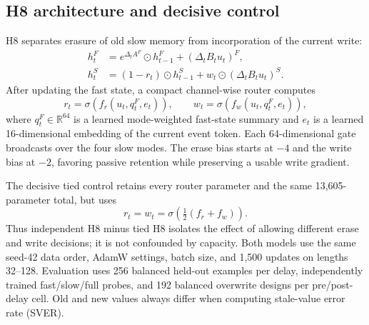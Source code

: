 \documentclass[10pt,a4paper]{article}
\begin{document}
\subsection{H8 architecture and decisive control}
H8 separates erasure of old slow memory from incorporation of the current write:
\begin{align}
h_t^F &= e^{\Delta_tA^F}\odot h_{t-1}^F+(\Delta_tB_tu_t)^F,\\
h_t^S &= (1-r_t)\odot h_{t-1}^S+w_t\odot(\Delta_tB_tu_t)^S.
\end{align}
After updating the fast state, a compact channel-wise router computes
\[
r_t=\sigma(f_r(u_t,q_t^F,e_t)),\qquad
w_t=\sigma(f_w(u_t,q_t^F,e_t)),
\]
where $q_t^F\in\mathbb R^{64}$ is a learned mode-weighted fast-state summary and $e_t$ is a learned 16-dimensional embedding of the current event token. Each 64-dimensional gate broadcasts over the four slow modes. The erase bias starts at $-4$ and the write bias at $-2$, favoring passive retention while preserving a usable write gradient.

The decisive tied control retains every router parameter and the same 13,605-parameter total, but uses
\[
r_t=w_t=\sigma\!\left(\tfrac12(f_r+f_w)\right).
\]
Thus independent H8 minus tied H8 isolates the effect of allowing different erase and write decisions; it is not confounded by capacity. Both models use the same seed-42 data order, AdamW settings, batch size, and 1,500 updates on lengths 32--128. Evaluation uses 256 balanced held-out examples per delay, independently trained fast/slow/full probes, and 192 balanced overwrite designs per pre/post-delay cell. Old and new values always differ when computing stale-value error rate (SVER).

\begin{table}[!htbp]
\centering\small
\caption{H8 primary results (seed 42, accuracy in \%). Long probes are diagnostic and use separate long-horizon supervision.}
\label{tab:h8-primary}
\end{table}
\end{document}
